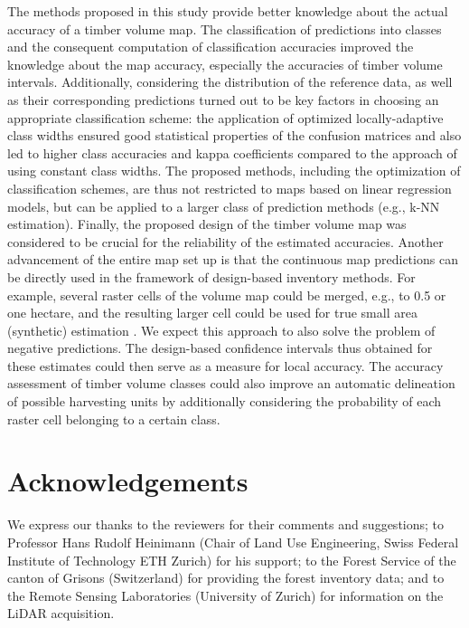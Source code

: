 The methods proposed in this study provide better knowledge about the actual accuracy of a timber volume map. The classification of predictions into classes and the consequent computation of classification accuracies improved the knowledge about the map accuracy, especially the accuracies of timber volume intervals. Additionally, considering the distribution of the reference data, as well as their corresponding predictions turned out to be key factors in choosing an appropriate classification scheme: the application of optimized locally-adaptive class widths ensured good statistical properties of the confusion matrices and also led to higher class accuracies and kappa coefficients compared to the approach of using constant class widths. The proposed methods, including the optimization of classification schemes, are thus not restricted to maps based on linear regression models, but can be applied to a larger class of prediction methods (e.g., k-NN estimation). Finally, the proposed design of the timber volume map was considered to be crucial for the reliability of the estimated accuracies. Another advancement of the entire map set up is that the continuous map predictions can be directly used in the framework of design-based inventory methods. For example, several raster cells of the volume map could be merged, e.g., to 0.5 or one hectare, and the resulting larger cell could be used for true small area (synthetic) estimation \citep{mandallaz2013a}. We expect this approach to also solve the problem of negative predictions. The design-based confidence intervals thus obtained for these estimates could then serve as a measure for local accuracy. The accuracy assessment of timber volume classes could also improve an automatic delineation of possible harvesting units by additionally considering the probability of each raster cell belonging to a certain class.


\section*{Acknowledgements}
\thispagestyle{plain}

We express our thanks to the reviewers for their comments and suggestions; to Professor Hans Rudolf Heinimann (Chair of Land Use Engineering, Swiss Federal Institute of Technology ETH Zurich) for his support; to the Forest Service of the canton of Grisons (Switzerland) for providing the forest inventory data; and to the Remote Sensing Laboratories (University of Zurich) for information on the LiDAR acquisition.

